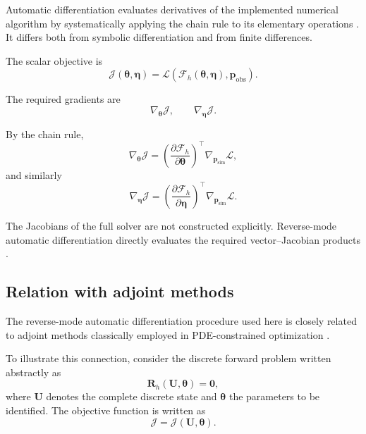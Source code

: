 \documentclass[11pt,a4paper]{report}
\theoremstyle{plain}
\theoremstyle{definition}
\begin{document}
Automatic differentiation evaluates derivatives of the implemented numerical
algorithm by systematically applying the chain rule to its elementary
operations \cite{griewank2008evaluating}. It differs both from
symbolic differentiation and from finite differences.

The scalar objective is
\begin{equation}
\mathcal{J}
(\boldsymbol{\theta},\boldsymbol{\eta})
=
\mathcal{L}
\left(
\mathcal{F}_h
(\boldsymbol{\theta},\boldsymbol{\eta}),
\mathbf{p}_{\mathrm{obs}}
\right).
\end{equation}

The required gradients are
\begin{equation}
\nabla_{\boldsymbol{\theta}}\mathcal{J},
\qquad
\nabla_{\boldsymbol{\eta}}\mathcal{J}.
\end{equation}

By the chain rule,
\begin{equation}
\nabla_{\boldsymbol{\theta}}\mathcal{J}
=
\left(
\frac{\partial\mathcal{F}_h}
     {\partial\boldsymbol{\theta}}
\right)^{\!\top}
\nabla_{\mathbf{p}_{\mathrm{sim}}}
\mathcal{L},
\label{eq:chain_rule_parameters}
\end{equation}
and similarly
\begin{equation}
\nabla_{\boldsymbol{\eta}}\mathcal{J}
=
\left(
\frac{\partial\mathcal{F}_h}
     {\partial\boldsymbol{\eta}}
\right)^{\!\top}
\nabla_{\mathbf{p}_{\mathrm{sim}}}
\mathcal{L}.
\label{eq:chain_rule_law}
\end{equation}

The Jacobians of the full solver are not constructed explicitly.
Reverse-mode automatic differentiation directly evaluates the required
vector--Jacobian products \cite{jax_autodiff}.

\subsection{Relation with adjoint methods}
\label{subsec:autodiff_adjoint}

The reverse-mode automatic differentiation procedure used here is closely
related to adjoint methods classically employed in PDE-constrained
optimization \cite{griewank2008evaluating}.

To illustrate this connection, consider the discrete forward problem written
abstractly as
\begin{equation}
    \mathbf{R}_h
    \left(
        \mathbf{U},
        \boldsymbol{\theta}
    \right)
    =
    \mathbf{0},
    \label{eq:discrete_forward_residual}
\end{equation}
where $\mathbf{U}$ denotes the complete discrete state and
$\boldsymbol{\theta}$ the parameters to be identified. The objective function
is written as
\begin{equation}
    \mathcal{J}
    =
    \mathcal{J}
    \left(
        \mathbf{U},
        \boldsymbol{\theta}
    \right).
\end{equation}
\end{document}
